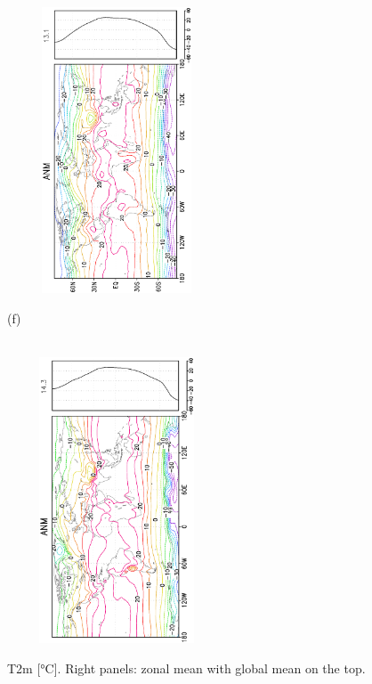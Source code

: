 \documentclass[12pt,a4paper,twoside,openright,headinclude,liststotoc,bibtotoc]{scrreprt}
\begin{document}
\begin{appendix}
\begin{figure}[H]
{\includegraphics[height=8.5cm,width=6.5cm,angle=-90]
{eps/zonalceltmT2m167.eps}
}
\parbox{8.5cm}{\hspace{0.25cm}\begin{scriptsize}(f)\end{scriptsize} \vspace{-0.5cm} \\
\includegraphics[height=8.5cm,width=6.5cm,angle=-90]
{eps/zonalcelt21tmt2m.eps}
}
\caption[T2m]{T2m [°C]. Right panels: zonal mean with global mean on the top.}
\label{img:t2m}
\end{figure}




\end{appendix}
\end{document}
